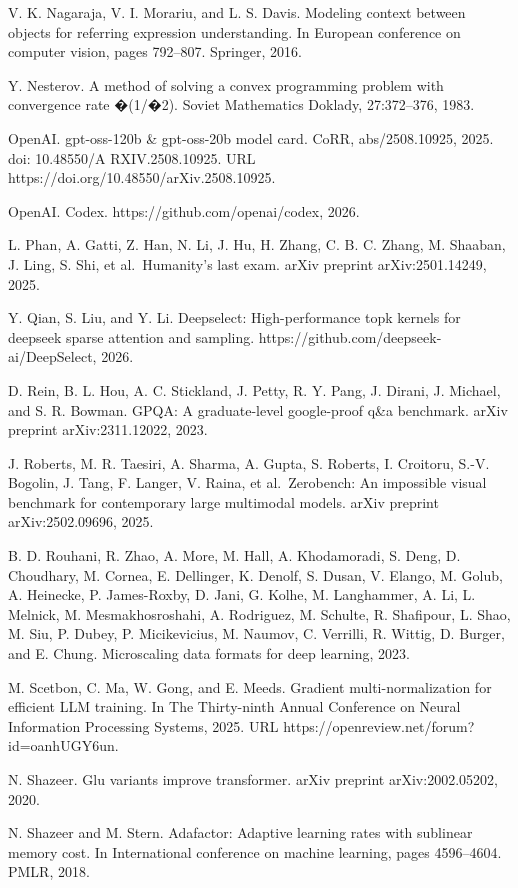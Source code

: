 \documentclass[
  10
]{article}
\begin{document}
V. K. Nagaraja, V. I. Morariu, and L. S. Davis. Modeling context between
objects for referring expression understanding. In European conference
on computer vision, pages 792--807. Springer, 2016.

Y. Nesterov. A method of solving a convex programming problem with
convergence rate �(1/�2). Soviet Mathematics Doklady, 27:372--376, 1983.

OpenAI. gpt-oss-120b \& gpt-oss-20b model card. CoRR, abs/2508.10925,
2025. doi: 10.48550/A RXIV.2508.10925. URL
https://doi.org/10.48550/arXiv.2508.10925.

OpenAI. Codex. https://github.com/openai/codex, 2026.

L. Phan, A. Gatti, Z. Han, N. Li, J. Hu, H. Zhang, C. B. C. Zhang, M.
Shaaban, J. Ling, S. Shi, et al.~Humanity's last exam. arXiv preprint
arXiv:2501.14249, 2025.

Y. Qian, S. Liu, and Y. Li. Deepselect: High-performance topk kernels
for deepseek sparse attention and sampling.
https://github.com/deepseek-ai/DeepSelect, 2026.

D. Rein, B. L. Hou, A. C. Stickland, J. Petty, R. Y. Pang, J. Dirani, J.
Michael, and S. R. Bowman. GPQA: A graduate-level google-proof q\&a
benchmark. arXiv preprint arXiv:2311.12022, 2023.

J. Roberts, M. R. Taesiri, A. Sharma, A. Gupta, S. Roberts, I. Croitoru,
S.-V. Bogolin, J. Tang, F. Langer, V. Raina, et al.~Zerobench: An
impossible visual benchmark for contemporary large multimodal models.
arXiv preprint arXiv:2502.09696, 2025.

B. D. Rouhani, R. Zhao, A. More, M. Hall, A. Khodamoradi, S. Deng, D.
Choudhary, M. Cornea, E. Dellinger, K. Denolf, S. Dusan, V. Elango, M.
Golub, A. Heinecke, P. James-Roxby, D. Jani, G. Kolhe, M. Langhammer, A.
Li, L. Melnick, M. Mesmakhosroshahi, A. Rodriguez, M. Schulte, R.
Shafipour, L. Shao, M. Siu, P. Dubey, P. Micikevicius, M. Naumov, C.
Verrilli, R. Wittig, D. Burger, and E. Chung. Microscaling data formats
for deep learning, 2023.

M. Scetbon, C. Ma, W. Gong, and E. Meeds. Gradient multi-normalization
for efficient LLM training. In The Thirty-ninth Annual Conference on
Neural Information Processing Systems, 2025. URL
https://openreview.net/forum?id=oanhUGY6un.

N. Shazeer. Glu variants improve transformer. arXiv preprint
arXiv:2002.05202, 2020.

N. Shazeer and M. Stern. Adafactor: Adaptive learning rates with
sublinear memory cost. In International conference on machine learning,
pages 4596--4604. PMLR, 2018.
\end{document}
